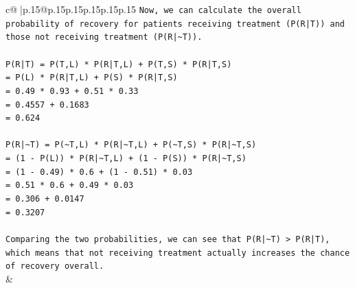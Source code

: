 \documentclass{article}
\begin{document}
{\begin{supertabular}{c@{$\;$}|p{.15\linewidth}@{}p{.15\linewidth}p{.15\linewidth}p{.15\linewidth}p{.15\linewidth}p{.15\linewidth}}
{{{\texttt{Now, we can calculate the overall probability of recovery for patients receiving treatment (P(R|T)) and those not receiving treatment (P(R|\textasciitilde{}T)).} \\
\\ 
\texttt{P(R|T) = P(T,L) * P(R|T,L) + P(T,S) * P(R|T,S)} \\
\texttt{= P(L) * P(R|T,L) + P(S) * P(R|T,S)} \\
\texttt{= 0.49 * 0.93 + 0.51 * 0.33} \\
\texttt{= 0.4557 + 0.1683} \\
\texttt{= 0.624} \\
\\ 
\texttt{P(R|\textasciitilde{}T) = P(\textasciitilde{}T,L) * P(R|\textasciitilde{}T,L) + P(\textasciitilde{}T,S) * P(R|\textasciitilde{}T,S)} \\
\texttt{= (1 {-} P(L)) * P(R|\textasciitilde{}T,L) + (1 {-} P(S)) * P(R|\textasciitilde{}T,S)} \\
\texttt{= (1 {-} 0.49) * 0.6 + (1 {-} 0.51) * 0.03} \\
\texttt{= 0.51 * 0.6 + 0.49 * 0.03} \\
\texttt{= 0.306 + 0.0147} \\
\texttt{= 0.3207} \\
\\ 
\texttt{Comparing the two probabilities, we can see that P(R|\textasciitilde{}T) > P(R|T), which means that not receiving treatment actually increases the chance of recovery overall.} \\
            }
        }
    }
    & \\ \\


\end{supertabular}}
\end{document}
